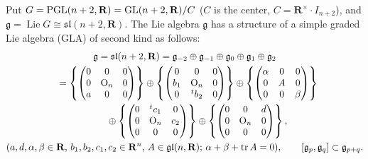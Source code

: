 Put $G={\rm PGL}(n+2,{\mathbf{R}})={\rm GL}(n+2,{\mathbf{R}})/C$ ($C$ is the center,
$C=\mathbf{R}^{\times}\cdot I_{n+2}$),
and $\mathfrak{g}=\operatorname{Lie} G \cong \mathfrak{sl}(n+2,{\mathbf{R}})$.
The Lie algebra $\mathfrak{g}$ has a structure of
a simple graded Lie algebra (GLA) of second kind as follows:
\begin{gather*}
       {\mathfrak g} = {\mathfrak{sl}}(n+2,{\mathbf{R}})  = {\mathfrak g}_{-2}\oplus {\mathfrak g}_{-1} \oplus
                    {\mathfrak g}_0
                    \oplus {\mathfrak g}_1 \oplus {\mathfrak g}_2 \\
\hphantom{{\mathfrak g}}{}
= \left\{{\begin{pmatrix}
                       0 & 0 & 0 \\
                       0 & \mathrm{O}_n & 0 \\
                       a & 0 & 0
                    \end{pmatrix}}\right\}
                       \oplus
                    \left\{{\begin{pmatrix}
                       0 & 0 & 0 \\
                       b_1 & \mathrm{O}_n & 0 \\
                       0 & {}^tb_2 & 0
                    \end{pmatrix}}\right\}
                       \oplus
                    \left\{{\begin{pmatrix}
                       \alpha & 0 & 0 \\
                       0 & A & 0 \\
                       0 & 0 &\beta
                    \end{pmatrix}}\right\} \\
\hphantom{{\mathfrak g}=}{} \quad {}\oplus
                    \left\{{\begin{pmatrix}
                       0 & {}^tc_1 & 0 \\
                       0 & \mathrm{O}_n & c_2 \\
                       0 & 0 & 0
                    \end{pmatrix}}\right\}
                       \oplus
                    \left\{{\begin{pmatrix}
                       0 & 0 & d \\
                       0 & \mathrm{O}_n & 0 \\
                       0 & 0 & 0
                     \end{pmatrix}}\right\}, \\
  (a,d,\alpha,\beta \in {\mathbf R},\,  b_1,b_2,c_1,c_2\in
                    {\mathbf R}^n, \, A\in \mathfrak{gl}(n,{\mathbf{R}}); \,
                    \alpha +\beta +\operatorname{tr}A=0),
                  \qquad [\mathfrak{g}_p,\mathfrak{g}_q] \subset
                    \mathfrak{g}_{p+q}.
\end{gather*}
